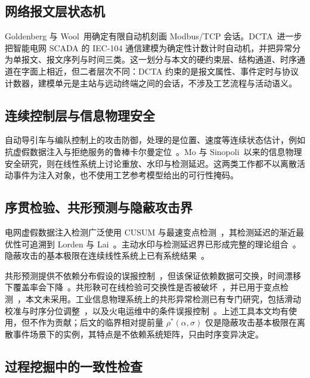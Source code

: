 \documentclass[manuscript,screen,review]{acmart}
\begin{document}
\subsection{网络报文层状态机}
\label{sec:rw_packet}

Goldenberg 与 Wool~\cite{goldenberg2013modbus}用确定有限自动机刻画 {Modbus}/{TCP} 会话。DCTA~\cite{barsha2024dcta}进一步把智能电网 {SCADA} 的 {IEC-104} 通信建模为确定性计数计时自动机，并把异常分为单报文、报文序列与时间三类。这一划分与本文的硬约束层、结构通道、时序通道在字面上相近，但二者层次不同：DCTA 约束的是报文属性、事件定时与协议计数器，建模单元是主站与远动终端之间的会话，不涉及工艺流程与活动语义。

\subsection{连续控制层与信息物理安全}
\label{sec:rw_agv}

自动导引车与编队控制上的攻击防御，处理的是位置、速度等连续状态估计，例如抗虚假数据注入与拒绝服务的鲁棒卡尔曼定位~\cite{elsisi2023agv}。Mo 与 Sinopoli~\cite{mo2009replay}以来的信息物理安全研究，则在线性系统上讨论重放、水印与检测延迟。这两类工作都不以离散活动事件为注入对象，也不使用工艺参考模型给出的可行性掩码。

\subsection{序贯检验、共形预测与隐蔽攻击界}
\label{sec:rw_tools}

电网虚假数据注入检测广泛使用 {CUSUM} 与最速变点检测~\cite{li2015quickest}，其检测延迟的渐近最优性可追溯到 {Lorden} 与 {Lai}~\cite{lorden1971procedures,lai1998information}。主动水印与检测延迟界已形成完整的理论组合~\cite{naha2023watermark}。隐蔽攻击的基本极限在连续线性系统上已有系统结果~\cite{liu2022limits}。

共形预测提供不依赖分布假设的误报控制~\cite{shafer2008conformal,angelopoulos2023conformal}，但该保证依赖数据可交换，时间漂移下覆盖率会下降~\cite{barber2023exchangeability}。共形鞅可在线检验可交换性是否被破坏~\cite{vovk2003testing}，并已用于变点检测~\cite{volkhonskiy2017inductive}，本文未采用。工业信息物理系统上的共形异常检测已有专门研究，包括滑动校准与时序分位调整~\cite{yuan2026conformal}，以及火电运维中的条件误报控制~\cite{kundacina2025conformal}。上述工具本文均有使用，但不作为贡献；后文的临界相对提前量 $\rho^*(\alpha,\sigma)$ 仅是隐蔽攻击基本极限在离散事件场景下的实例，其特点是不依赖系统矩阵，只由时序变异决定。

\subsection{过程挖掘中的一致性检查}
\label{sec:rw_pm}
\end{document}
